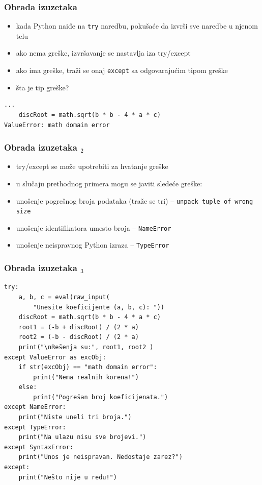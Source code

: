 \documentclass[utf8,compress]{beamer}
\begin{document}
\begin{frame}[fragile]
  \frametitle{Obrada izuzetaka}
  \begin{itemize}
    \item kada Python naiđe na \texttt{try} naredbu, pokušaće da izvrši sve naredbe u njenom telu
    \item ako nema greške, izvršavanje se nastavlja iza try/except
    \item ako ima greške, traži se onaj \texttt{except} sa odgovarajućim tipom greške
    \item šta je tip greške?
  \end{itemize}
\begin{verbatim}
...
    discRoot = math.sqrt(b * b - 4 * a * c)
ValueError: math domain error
\end{verbatim}
\end{frame}

\begin{frame}[fragile]
  \frametitle{Obrada izuzetaka $_2$}
  \begin{itemize}
    \item try/except se može upotrebiti za hvatanje  greške
    \item u slučaju prethodnog primera mogu se javiti sledeće greške:
    \item unošenje pogrešnog broja podataka (traže se tri) -- \texttt{unpack tuple of wrong size}
    \item unošenje identifikatora umesto broja -- \texttt{NameError}
    \item unošenje neispravnog Python izraza -- \texttt{TypeError}
  \end{itemize}
\end{frame}

\begin{frame}[fragile,shrink=10]
  \frametitle{Obrada izuzetaka $_3$}
\begin{verbatim}
try:
    a, b, c = eval(raw_input(
        "Unesite koeficijente (a, b, c): "))
    discRoot = math.sqrt(b * b - 4 * a * c)
    root1 = (-b + discRoot) / (2 * a)
    root2 = (-b - discRoot) / (2 * a)
    print("\nRešenja su:", root1, root2 )
except ValueError as excObj:
    if str(excObj) == "math domain error":
        print("Nema realnih korena!")
    else:
        print("Pogrešan broj koeficijenata.")
except NameError:
    print("Niste uneli tri broja.")
except TypeError:
    print("Na ulazu nisu sve brojevi.")
except SyntaxError:
    print("Unos je neispravan. Nedostaje zarez?")
except:
    print("Nešto nije u redu!")
\end{verbatim}
\end{frame}
\end{document}
